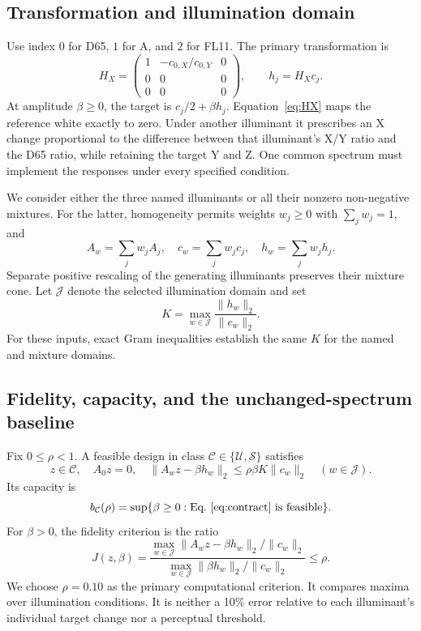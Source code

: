 \documentclass{optica-article}
\begin{document}
\subsection{Transformation and illumination domain}
Use index $0$ for D65, $1$ for A, and $2$ for FL11. The primary transformation is
\begin{equation}
 H_X=\begin{pmatrix}1&-c_{0,X}/c_{0,Y}&0\\0&0&0\\0&0&0\end{pmatrix},
 \qquad h_j=H_Xc_j.
 \label{eq:HX}
\end{equation}
At amplitude $\beta\geq0$, the target is $c_j/2+\beta h_j$. Equation~\eqref{eq:HX} maps the reference white exactly to zero. Under another illuminant it prescribes an X change proportional to the difference between that illuminant's X/Y ratio and the D65 ratio, while retaining the target Y and Z. One common spectrum must implement the responses under every specified condition.

We consider either the three named illuminants or all their nonzero non-negative mixtures. For the latter, homogeneity permits weights $w_j\geq0$ with $\sum_jw_j=1$, and
\begin{equation}
 A_w=\sum_jw_jA_j,\quad c_w=\sum_jw_jc_j,\quad h_w=\sum_jw_jh_j.
 \label{eq:mixture}
\end{equation}
Separate positive rescaling of the generating illuminants preserves their mixture cone. Let $\mathcal J$ denote the selected illumination domain and set
\begin{equation}
 K=\max_{w\in\mathcal J}\frac{\|h_w\|_2}{\|c_w\|_2}.
 \label{eq:K}
\end{equation}
For these inputs, exact Gram inequalities establish the same $K$ for the named and mixture domains. 

\subsection{Fidelity, capacity, and the unchanged-spectrum baseline}
Fix $0\leq\rho<1$. A feasible design in class $\mathcal C\in\{\mathcal U,\mathcal S\}$ satisfies
\begin{equation}
 z\in\mathcal C,\quad A_0z=0,\quad
 \|A_wz-\beta h_w\|_2\leq\rho\beta K\|c_w\|_2
 \quad(w\in\mathcal J).
 \label{eq:contract}
\end{equation}
Its capacity is
\begin{equation}
 b_{\mathcal C}(\rho)=\sup\{\beta\geq0:\text{Eq.~\eqref{eq:contract} is feasible}\}.
 \label{eq:capacity}
\end{equation}
For $\beta>0$, the fidelity criterion is the ratio
\begin{equation}
 J(z,\beta)=\frac{\displaystyle\max_{w\in\mathcal J}
 \|A_wz-\beta h_w\|_2/\|c_w\|_2}
 {\displaystyle\max_{w\in\mathcal J}
 \|\beta h_w\|_2/\|c_w\|_2}\leq\rho.
 \label{eq:relative}
\end{equation}
We choose $\rho=0.10$ as the primary computational criterion. It compares maxima over illumination conditions. It is neither a 10\% error relative to each illuminant's individual target change nor a perceptual threshold.
\end{document}
